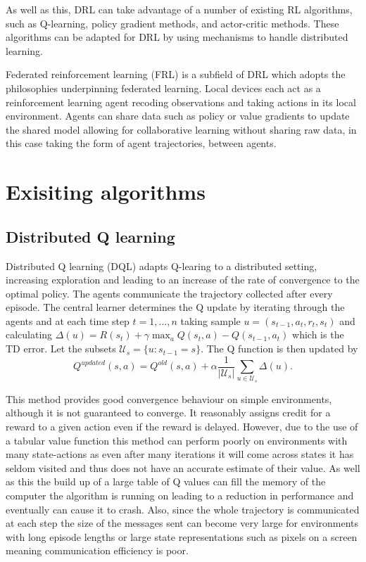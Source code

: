 As well as this, DRL can take advantage of a number of existing RL algorithms, such as Q-learning, policy gradient methods, and actor-critic methods. These algorithms can be adapted for DRL by using mechanisms to handle distributed learning.

Federated reinforcement learning (FRL) \cite{FRL} is a subfield of DRL which adopts the philosophies underpinning federated learning. Local devices each act as a reinforcement learning agent recoding observations and taking actions in its local environment. Agents can share data such as policy or value gradients to update the shared model allowing for collaborative learning without sharing raw data, in this case taking the form of agent trajectories, between agents.

\section{Exisiting algorithms}
\subsection{Distributed Q learning}
Distributed Q learning (DQL) adapts Q-learing to a distributed setting, increasing exploration and leading to an increase of the rate of convergence to the optimal policy. 
The agents communicate the trajectory collected after every episode.
The central learner determines the Q update by iterating through the agents and at each time step $t=1,\dots,n$ taking sample $u = (s_{t-1},a_t,r_t,s_t)$  and calculating $\Delta(u) = R(s_t) + \gamma \max_a Q(s_t,a) - Q(s_{t-1},a_t)$ which is the TD error.
Let the subsets $\mathcal{U}_s = \{u: s_{t-1}=s\}$.
The Q function is then updated by 
\begin{equation*}
    Q^{updated}(s,a) = Q^{old}(s,a) + \alpha \frac{1}{|\mathcal{U}_s|} \sum_{u \in \mathcal{U}_s} \Delta(u).
\end{equation*}

This method provides good convergence behaviour on simple environments, although it is not guaranteed to converge. It reasonably assigns credit for a reward to a given action even if the reward is delayed. However, due to the use of a tabular value function this method can perform poorly on environments with many state-actions as even after many iterations it will come across states it has seldom visited and thus does not have an accurate estimate of their value. As well as this the build up of a large table of Q values can fill the memory of the computer the algorithm is running on leading to a reduction in performance and eventually can cause it to crash.
Also, since the whole trajectory is communicated at each step the size of the messages sent can become very large for environments with long episode lengths or large state representations such as pixels on a screen meaning communication efficiency is poor.

